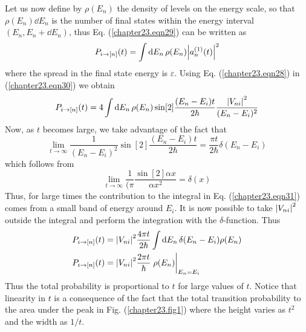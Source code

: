 Let us now define by $\rho(E_n)$ the density of levels on the energy scale, so that $\rho(E_n) \dd{E_n}$  is the number of final states within the energy interval $(E_n, E_n + \dd{E_n})$, thus Eq. (\ref{chapter23.eqn29}) can be written as
\begin{equation}
\label{chapter23.eqn30}
	P_{i \rightarrow [n]}(t) = \int \dd{E_n} \rho(E_n) \abs{a_n^{(1)}(t)}^2
\end{equation}
where the spread in the final state energy is $\varepsilon$. Using Eq. (\ref{chapter23.eqn28}) in (\ref{chapter23.eqn30}) we obtain
\begin{equation}
\label{chapter23.eqn31}
P_{i \rightarrow [n]}(t) = 4 \int \dd{E_n} \rho(E_n) \sin[2]{\frac{(E_n - E_i)t}{2 \hbar}} \frac{\abs{V_{n i}}^2}{(E_n - E_i)^2}
\end{equation}
Now, as $t$ becomes large, we take advantage of the fact that
\begin{equation}
\lim\limits_{t \rightarrow \infty} \frac{1}{(E_n - E_i)^2} \sin[2]{\frac{(E_n - E_i)t}{2 \hbar}} = \frac{\pi t}{2 \hbar} \delta(E_n - E_i)
\end{equation}
which follows from
\begin{equation}
\lim\limits_{t \rightarrow \infty} \frac{1}{(\pi} \frac{\sin[2]{\alpha x}}{\alpha x^2} =  \delta(x)
\end{equation}
Thus, for large times the contribution to the integral in Eq. (\ref{chapter23.eqn31}) comes from a small band of energy around $E_i$. It is now possible to take $\abs{V_{n i}}^2$ outside the integral and perform the integration with the $\delta$-function. Thus
\begin{align}
P_{i \rightarrow [n]}(t) &= \abs{V_{n i}}^2 \frac{4\pi t}{2 \hbar} \int \dd{E_n} \delta(E_n - E_i)\rho(E_n)  \nonumber\\
P_{i \rightarrow [n]}(t) &= \abs{V_{n i}}^2 \frac{2\pi t}{\hbar} \eval{\rho(E_n)}_{E_n=E_i}
\label{chapter23.eqn32}
\end{align}
Thus the total probability is proportional to $t$ for large values of $t$. Notice that linearity in $t$ is a consequence of the fact that the total transition probability to the area under the peak in Fig. (\ref{chapter23.fig1}) where the height varies as $t^2$ and the width as $1/t$.

